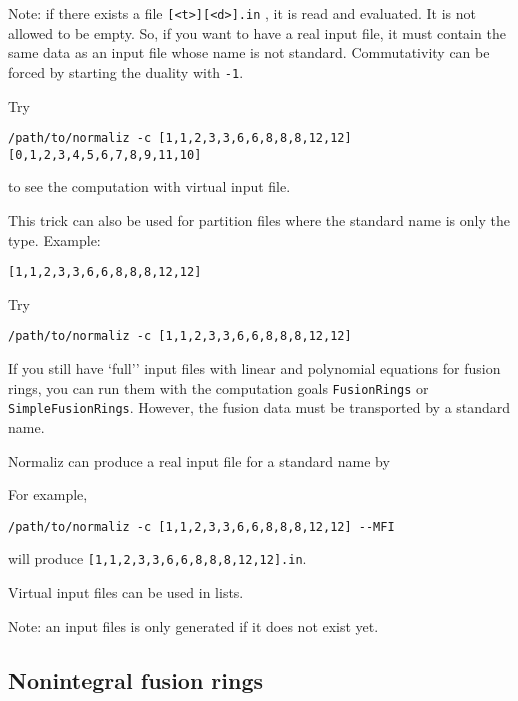 Note: if there exists a file \verb*|[<t>][<d>].in| , it is read and evaluated. It is not allowed to be empty. So, if you want to have a real input file, it must contain the same data as an input file whose name is not standard. 
Commutativity can be forced by starting the duality with \verb*|-1|.

Try
\begin{Verbatim}
/path/to/normaliz -c [1,1,2,3,3,6,6,8,8,8,12,12][0,1,2,3,4,5,6,7,8,9,11,10]
\end{Verbatim}
to see the computation with virtual input file.

This trick can also be used for partition files where the standard name is only the type. Example:
\begin{Verbatim}
[1,1,2,3,3,6,6,8,8,8,12,12]
\end{Verbatim}
Try
\begin{Verbatim}
/path/to/normaliz -c [1,1,2,3,3,6,6,8,8,8,12,12]
\end{Verbatim}

If you still have `full'' input files with linear and polynomial equations for fusion rings, you can run them with the computation goals \verb*|FusionRings| or \verb|SimpleFusionRings|. However, the fusion data must be transported by a standard name.

Normaliz can produce a real input file for a standard name by
\begin{itemize}
\end{itemize}
For example,
\begin{Verbatim}
/path/to/normaliz -c [1,1,2,3,3,6,6,8,8,8,12,12] --MFI
\end{Verbatim}
will produce \verb*|[1,1,2,3,3,6,6,8,8,8,12,12].in|.

Virtual input files can be used in lists.

Note: an input files is only generated if it does not exist yet. 

\subsection{Nonintegral fusion rings}

